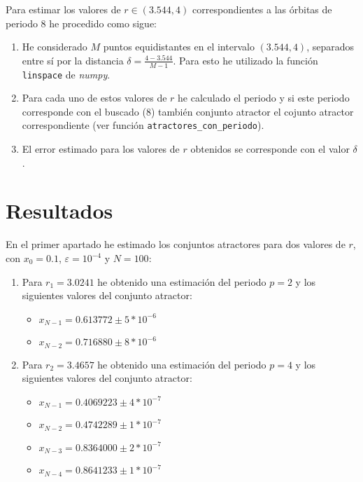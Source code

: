 \documentclass[10pt, spanish]{article}
\theoremstyle{definition}
\theoremstyle{break}
\begin{document}
Para estimar los valores de $r\in(3.544, 4)$ correspondientes a las órbitas de periodo 8 he
procedido como sigue:
\begin{enumerate}
    \item He considerado $M$ puntos equidistantes en el intervalo $(3.544,4)$,
        separados entre sí por la distancia $\delta = \frac{4-3.544}{M-1}$. Para
        esto he utilizado la función \texttt{linspace} de \textit{numpy}.
    \item Para cada uno de estos valores de $r$ he calculado el periodo y si
        este periodo corresponde con el buscado (8) también conjunto atractor el
        cojunto atractor correspondiente (ver función
        \texttt{atractores\_con\_periodo}).
    \item El error estimado para los valores de $r$ obtenidos se corresponde con
        el valor $\delta$.
\end{enumerate} 

\section{Resultados}

En el primer apartado he estimado los conjuntos atractores para dos valores de
$r$, con $x_0=0.1$, $\varepsilon = 10^{-4}$ y $N=100$:
\begin{enumerate}
    \item Para $r_1=3.0241$ he obtenido una estimación del periodo $p=2$ y los
        siguientes valores del conjunto atractor:
        \begin{multicols}{2}
            \begin{itemize}
                \item $x_{N-1}=0.613772\pm5*10^{-6}$ 
                \item $x_{N-2}=0.716880\pm8*10^{-6}$ 
            \end{itemize}
        \end{multicols}
    \item Para $r_2=3.4657$ he obtenido una estimación del periodo $p=4$ y los
        siguientes valores del conjunto atractor:
        \begin{multicols}{2}
            \begin{itemize}
                \item $x_{N-1} = 0.4069223\pm4*10^{-7}$
                \item $x_{N-2} = 0.4742289\pm1*10^{-7}$
                \item $x_{N-3} = 0.8364000\pm2*10^{-7}$
                \item $x_{N-4} = 0.8641233\pm1*10^{-7}$
            \end{itemize}
        \end{multicols}
\end{enumerate}
\end{document}
